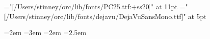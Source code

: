 \let\everymathextra\relax
\let\preamble\relax

\let\seq\relax
\let\lname\relax
\let\sname\relax
\let\uname\relax
\let\chars\relax
\let\names\relax
\let\glyph\relax
\let\rglyf\relax
\let\image\relax
\let\notes\relax
\let\stags\relax

\let\sqdbcun\relax
\let\sqdbpua\relax
\let\sqseq\relax
\let\sqinv\relax
\let\sqchr\relax

\let\imagefloat\relax
\let\imagecaption\relax

\let\remfor\relax
\let\Hhhhh\relax

\let\ofspc\pcxxv

\def\unames{\eight\rm}

\def\ofs#1#2#3{}
\let\ofspc\pcxxv

\font\pcssxx="[/Users/stinney/orc/lib/fonts/PC25.ttf:+ss20]" at 11pt
\font\mono="[/Users/stinney/orc/lib/fonts/dejavu/DejaVuSansMono.ttf]" at 5pt

\def\ccchr{\pcssxx}
\def\ccuni{\mono}

\newdimen\ccwd \ccwd=2em\relax
\newdimen\ccht \ccht=3em\relax
\newdimen\cccwd \cccwd=2em\relax
\newdimen\cccht \cccht=2.5em\relax

\def\tbodyrule{\noalign{\hrule\vskip3pt plus1pt minus1pt}}


\def\not{\colorbox{ntgrey}}
\def\sqchr{\colorbox{sqyellow}}
\def\sqinv{\colorbox{sqblue}}
\def\sqopq{\colorbox{sqpink}}
\def\sqseq{\colorbox{sqgreen}}

\def\ucode#1{\eight\rm}

\def\tablerule{\noalign{\hrule}}

\let\trhook\relax
\def\tvrule{\vrule}

\def\codechart{\def\thead{\eight\rm}%
  \def\trhook{\message{trhook}\gdef\tvrule{\vrule width1pt\relax\gdef\tvrule{\vrule\relax}}}%
}

\endinput
